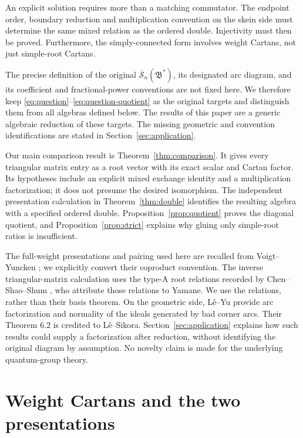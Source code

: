 \documentclass[11pt]{article}
\theoremstyle{definition}
\theoremstyle{remark}
\newcommand{\cS}{\overline{\mathscr{S}}}
\begin{document}
An explicit solution requires more than a matching commutator. The endpoint order, boundary reduction and multiplication convention on the skein side must determine the same mixed relation as the ordered double. Injectivity must then be proved. Furthermore, the simply-connected form involves weight Cartans, not just simple-root Cartans.

The precise definition of the original $\cS_n(\mathfrak B^*)$, its designated arc diagram, and its coefficient and fractional-power conventions are not fixed here. We therefore keep \eqref{eq:question}--\eqref{eq:question-quotient} as the original targets and distinguish them from all algebras defined below. The results of this paper are a generic algebraic reduction of these targets. The missing geometric and convention identifications are stated in Section~\ref{sec:application}.

Our main comparison result is Theorem~\ref{thm:comparison}. It gives every triangular matrix entry as a root vector with its exact scalar and Cartan factor. Its hypotheses include an explicit mixed exchange identity and a multiplication factorization; it does not presume the desired isomorphism. The independent presentation calculation in Theorem~\ref{thm:double} identifies the resulting algebra with a specified ordered double. Proposition~\ref{prop:quotient} proves the diagonal quotient, and Proposition~\ref{prop:strict} explains why gluing only simple-root ratios is insufficient.

The full-weight presentations and pairing used here are recalled from Voigt--Yuncken \cite[Definition 2.13, Proposition 2.14, and Section 2.8.1]{VY}; we explicitly convert their coproduct convention. The inverse triangular-matrix calculation uses the type-A root relations recorded by Chen--Shao--Shum \cite[Section 3]{CSS}, who attribute those relations to Yamane. We use the relations, rather than their basis theorem. On the geometric side, L\^e--Yu \cite[Theorems 6.2 and 7.2]{LY} provide arc factorization and normality of the ideals generated by bad corner arcs. Their Theorem 6.2 is credited to L\^e--Sikora. Section~\ref{sec:application} explains how such results could supply a factorization after reduction, without identifying the original diagram by assumption. No novelty claim is made for the underlying quantum-group theory.

\section{Weight Cartans and the two presentations}\label{sec:presentations}
\end{document}

